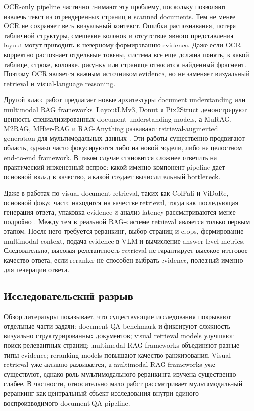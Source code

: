 \documentclass[conference]{IEEEtran}
\begin{document}
OCR-only pipeline частично снимают эту проблему, поскольку позволяют извлечь текст из отрендеренных страниц и scanned documents. Тем не менее OCR не сохраняет весь визуальный контекст. Ошибки распознавания, потеря табличной структуры, смешение колонок и отсутствие явного представления layout могут приводить к неверному формированию evidence. Даже если OCR корректно распознает отдельные токены, система все еще должна понять, к какой таблице, строке, колонке, рисунку или странице относится найденный фрагмент. Поэтому OCR является важным источником evidence, но не заменяет визуальный retrieval и visual-language reasoning.

Другой класс работ предлагает новые архитектуры document understanding или multimodal RAG frameworks. LayoutLMv3, Donut и Pix2Struct демонстрируют ценность специализированных document understanding models, а MuRAG, M2RAG, MHier-RAG и RAG-Anything развивают retrieval-augmented generation для мультимодальных данных \cite{layoutlmv32022,donut2021,pix2struct2022,murag2022,m2rag2025,mhierrag2025,raganything2025}. Эти работы существенно продвигают область, однако часто фокусируются либо на новой модели, либо на целостном end-to-end framework. В таком случае становится сложнее ответить на практический инженерный вопрос: какой именно компонент pipeline дает основной вклад в качество, а какой создает вычислительный bottleneck.

Даже в работах по visual document retrieval, таких как ColPali и ViDoRe, основной фокус часто находится на качестве retrieval, тогда как последующая генерация ответа, упаковка evidence и анализ latency рассматриваются менее подробно \cite{colpali2024}. Между тем в реальной RAG-системе retrieval является только первым этапом. После него требуется реранкинг, выбор страниц и crops, формирование multimodal context, подача evidence в VLM и вычисление answer-level metrics. Следовательно, высокая релевантность retrieval не гарантирует высокое итоговое качество ответа, если reranker не способен выбрать evidence, полезный именно для генерации ответа.

\subsection{Исследовательский разрыв}

Обзор литературы показывает, что существующие исследования покрывают отдельные части задачи: document QA benchmark-и фиксируют сложность визуально структурированных документов; visual retrieval models улучшают поиск релевантных страниц; multimodal RAG frameworks объединяют разные типы evidence; reranking models повышают качество ранжирования. Visual retrieval уже активно развивается, а multimodal RAG frameworks уже существуют, однако роль мультимодального реранкинга изучена существенно слабее. В частности, относительно мало работ рассматривает мультимодальный реранкинг как центральный объект исследования внутри единого воспроизводимого document QA pipeline.
\end{document}
